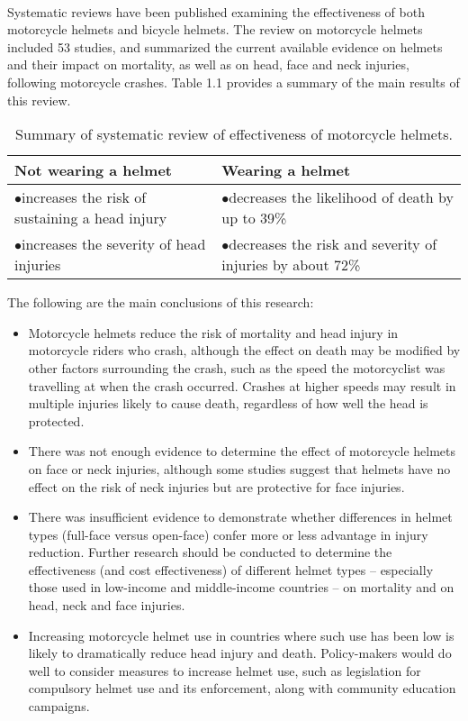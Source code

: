 \paragraph{}Systematic reviews have been published examining the effectiveness of both motorcycle helmets and bicycle helmets. The review on motorcycle helmets included 53 studies, and summarized the current available evidence on helmets and their impact on mortality, as well as on head, face and neck injuries, following motorcycle crashes. Table 1.1 provides a summary of the main results of this review.  
\begin{table}[h]
	\begin{center}
		\caption{Summary of systematic review of effectiveness of motorcycle helmets.}
		\label{Table 1.1}
		\begin{tabular}{l|l} 
			\textbf{Not wearing a helmet} & \textbf{Wearing a helmet} \\
			\hline
			$\bullet$increases the risk of sustaining a head injury & $\bullet$decreases the likelihood of death by up to 39\%\\
			$\bullet$increases the severity of head injuries & $\bullet$decreases the risk and severity of injuries by about 72\% \\
			
		\end{tabular}
	\end{center}
\end{table}
\pagebreak

The following are the main conclusions of this research:
\begin{itemize}
	\item Motorcycle helmets reduce the risk of mortality and head injury in motorcycle
	riders who crash, although the effect on death may be modified by other factors
	surrounding the crash, such as the speed the motorcyclist was travelling at when
	the crash occurred. Crashes at higher speeds may result in multiple injuries likely
	to cause death, regardless of how well the head is protected. 
	\item There was not enough evidence to determine the effect of motorcycle helmets on
	face or neck injuries, although some studies suggest that helmets have no effect on
	the risk of neck injuries but are protective for face injuries.
	\item There was insufficient evidence to demonstrate whether differences in helmet
	types (full-face versus open-face) confer more or less advantage in injury reduction. Further research should be conducted to determine the effectiveness (and
	cost effectiveness) of different helmet types – especially those used in low-income
	and middle-income countries – on mortality and on head, neck and face injuries.
	\item Increasing motorcycle helmet use in countries where such use has been low is likely
	to dramatically reduce head injury and death. Policy-makers would do well to consider measures to increase helmet use, such as legislation for compulsory helmet
	use and its enforcement, along with community education campaigns.
\end{itemize}


